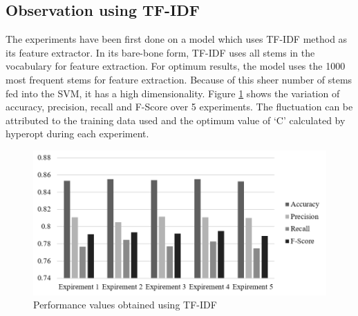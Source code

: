 \documentclass[fleqn --11pt --twoside]{IOEGC2016} %
\begin{document}
\subsection{Observation using TF-IDF}
The experiments have been first done on a model which uses TF-IDF method as its feature extractor. In its bare-bone form, TF-IDF uses all stems in the vocabulary for feature extraction. For optimum results, the model uses the 1000 most frequent stems for feature extraction. Because of this sheer number of stems fed into the SVM, it has a high dimensionality. Figure \ref{fig:performance_tf_idf} shows the variation of accuracy, precision, recall and F-Score over 5 experiments. The fluctuation can be attributed to the training data used and the optimum value of `C' calculated by hyperopt during each experiment.
\begin{figure}[!ht]
\centering
\includegraphics[width=\linewidth]{assets/performance_tf_idf}
\caption{Performance values obtained using TF-IDF}
\label{fig:performance_tf_idf}
\end{figure}
\end{document}
